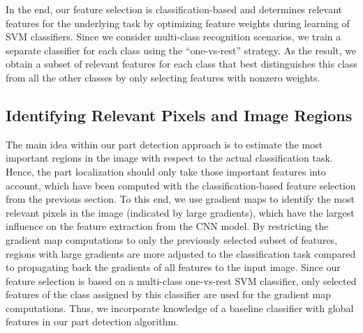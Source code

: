 \documentclass[runningheads]{llncs}
\begin{document}
In the end, our feature selection is classification-based and determines relevant features for the underlying task by optimizing feature weights during learning of SVM classifiers.
Since we consider multi-class recognition scenarios, we train a separate classifier for each class using the ``one-vs-rest'' strategy.
As the result, we obtain a subset of relevant features for each class that best distinguishes this class from all the other classes by only selecting features with nonzero weights.

\subsection{Identifying Relevant Pixels and Image Regions}
\label{sub:part_candidates}

The main idea within our part detection approach is to estimate the most important regions in the image with respect to the actual classification task.
Hence, the part localization should only take those important features into account, which have been computed with the classification-based feature selection from the previous section.
To this end, we use gradient maps \cite{simonyan2013deep} to identify the most relevant pixels in the image (indicated by large gradients), which have the largest influence on the feature extraction from the CNN model.
By restricting the gradient map computations to only the previously selected subset of features, regions with large gradients are more adjusted to the classification task compared to propagating back the gradients of all features to the input image.
Since our feature selection is based on a multi-class one-vs-rest SVM classifier, only selected features of the class assigned by this classifier are used for the gradient map computations.
Thus, we incorporate knowledge of a baseline classifier with global features in our part detection algorithm.
\end{document}

